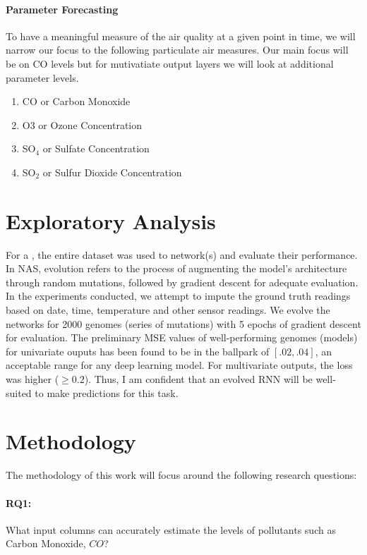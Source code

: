 \documentclass[12pt]{article}
\begin{document}
\paragraph{Parameter Forecasting} To have a meaningful measure of the air quality at a given point in time, we will narrow our focus to the following particulate air measures. Our main focus will be on CO levels but for mutivatiate output layers we will look at additional parameter levels.
\begin{enumerate}
    \item
        CO or Carbon Monoxide
    \item
        O3 or Ozone Concentration
    \item
        SO$_{4}$ or Sulfate Concentration
    \item
        SO$_{2}$ or Sulfur Dioxide Concentration
\end{enumerate}

\section{Exploratory Analysis}
For a , the entire dataset was used to  network(s) and evaluate their performance. In NAS, evolution refers to the process of augmenting the model's architecture through random mutations, followed by gradient descent for adequate evaluation. In the experiments conducted, we attempt to impute the ground truth readings based on date, time, temperature and other sensor readings. We evolve the networks for 2000 genomes (series of mutations) with 5 epochs of gradient descent for evaluation. The preliminary MSE values of well-performing genomes (models) for univariate ouputs has been found to be in the ballpark of $[.02,.04]$, an acceptable range for any deep learning model. For multivariate outputs, the loss was higher ($\geq 0.2$). Thus, I am confident that an evolved RNN will be well-suited to make predictions for this task. 

\section{Methodology}
The methodology of this work will focus around the following research questions:
\paragraph{RQ1:} What input columns can accurately estimate the levels of pollutants such as Carbon Monoxide, $CO$? \\
\end{document}
